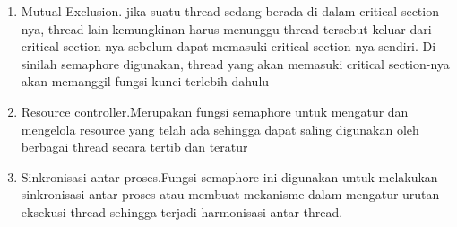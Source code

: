 		 \begin{enumerate}
		 	\item Mutual Exclusion. jika suatu thread sedang berada di dalam critical section-nya, thread lain kemungkinan  harus menunggu thread tersebut keluar dari critical section-nya sebelum dapat memasuki critical section-nya sendiri. Di sinilah semaphore digunakan, thread yang akan memasuki critical section-nya akan memanggil fungsi kunci terlebih dahulu 
			\item Resource controller.Merupakan fungsi semaphore untuk mengatur dan mengelola resource yang  telah ada sehingga dapat saling digunakan oleh berbagai thread secara tertib dan teratur
			\item Sinkronisasi antar proses.Fungsi semaphore ini digunakan  untuk melakukan sinkronisasi antar proses atau membuat mekanisme dalam mengatur urutan eksekusi thread sehingga terjadi harmonisasi antar thread.
		\end{enumerate}
		 	